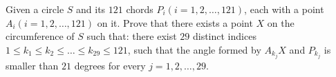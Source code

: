Given a circle $S$ and its $121$ chords $P_i (i=1,2,\ldots,121)$, each with a point $A_i(i=1,2,\ldots,121)$ on it. Prove that there exists a point $X$ on the circumference of $S$ such that: there exist $29$ distinct indices $1\le k_1\le k_2\le\ldots\le k_{29}\le 121$, such that the angle formed by ${A_{k_j}}X$ and ${P_{k_j}}$ is smaller than $21$ degrees for every $j=1,2,\ldots,29$.